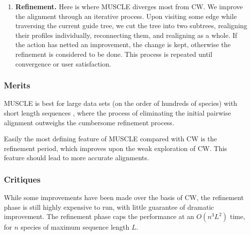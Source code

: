 \documentclass[10pt,twocolumn]{article}
\begin{document}
\begin{enumerate}
\begin{enumerate}
\end{enumerate}
  \item \textbf{Refinement.} Here is where MUSCLE diverges most from CW. We improve the alignment through an iterative process. Upon visiting some edge while traversing the current guide tree, we cut the tree into two subtrees, realigning their profiles individually, reconnecting them, and realigning as a whole.  If the action has netted an improvement, the change is kept, otherwise the refinement is considered to be done. This process is repeated until convergence or user satisfaction.
  \end{enumerate}
  
\subsubsection*{Merits}
MUSCLE is best for large data sets (on the order of hundreds of species) with short length sequences \cite{edgar2006multiple}, where the process of eliminating the initial pairwise alignment outweighs the cumbersome refinement process.

Easily the most defining feature of MUSCLE compared with CW is the refinement period, which improves upon the weak exploration of CW. This feature should lead to more accurate alignments.

\subsubsection*{Critiques}
While some improvements have been made over the basis of CW, the refinement phase is still highly expensive to run, with little guarantee of dramatic improvement. The refinement phase caps the performance at an $O(n^3L^2)$ time, for $n$ species of maximum sequence length $L$.
\end{document}

